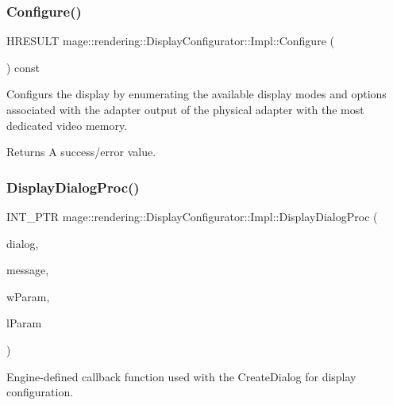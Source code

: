 \subsubsection{\texorpdfstring{Configure()}{Configure()}}
{\footnotesize\ttfamily H\+R\+E\+S\+U\+LT mage\+::rendering\+::\+Display\+Configurator\+::\+Impl\+::\+Configure (\begin{DoxyParamCaption}{ }\end{DoxyParamCaption}) const}

Configurs the display by enumerating the available display modes and options associated with the adapter output of the physical adapter with the most dedicated video memory.

\begin{DoxyReturn}{Returns}
A success/error value. 
\end{DoxyReturn}
\hypertarget{classmage_1_1rendering_1_1_display_configurator_1_1_impl_afc4446b37df590031bed6fa1243afb66}{}\label{classmage_1_1rendering_1_1_display_configurator_1_1_impl_afc4446b37df590031bed6fa1243afb66} 
\subsubsection{\texorpdfstring{Display\+Dialog\+Proc()}{DisplayDialogProc()}}
{\footnotesize\ttfamily I\+N\+T\+\_\+\+P\+TR mage\+::rendering\+::\+Display\+Configurator\+::\+Impl\+::\+Display\+Dialog\+Proc (\begin{DoxyParamCaption}\item[{H\+W\+ND}]{dialog,  }\item[{U\+I\+NT}]{message,  }\item[{\mbox{[}\mbox{[}maybe\+\_\+unused\mbox{]} \mbox{]} W\+P\+A\+R\+AM}]{w\+Param,  }\item[{\mbox{[}\mbox{[}maybe\+\_\+unused\mbox{]} \mbox{]} L\+P\+A\+R\+AM}]{l\+Param }\end{DoxyParamCaption})\hspace{0.3cm}{\ttfamily [private]}}

Engine-\/defined callback function used with the Create\+Dialog for display configuration.


